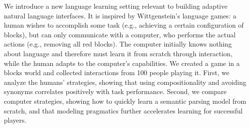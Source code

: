 We introduce a new language learning setting relevant to building adaptive natural language interfaces. It is inspired by Wittgenstein's language games: a human wishes to accomplish some task (e.g., achieving a certain configuration of blocks), but can only communicate with a computer, who performs the actual actions (e.g., removing all red blocks). The computer initially knows nothing about language and therefore must learn it from scratch through interaction, while the human adapts to the computer's capabilities. We created a game in a blocks world and collected interactions from 100 people playing it.  First, we analyze the humans' strategies, showing that using compositionality and avoiding synonyms correlates positively with task performance. Second, we compare computer strategies, showing how to quickly learn a semantic parsing model from scratch, and that modeling pragmatics further accelerates learning for successful players.
